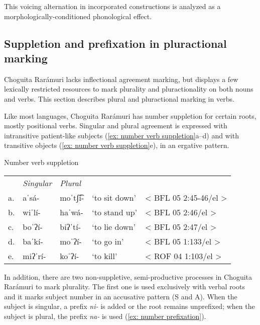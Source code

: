 This voicing alternation in incorporated constructions is analyzed as a morpho\-log\-i\-cally-conditioned phonological effect.


\subsection{Suppletion and prefixation in pluractional marking}
\label{subsec: number marking: suppletion and plural prefixes}

Choguita Rarámuri lacks inflectional agreement marking, but displays a few lexically restricted resources to mark plurality and pluractionality on both nouns and verbs. This section describes plural and pluractional marking in verbs.

Like most  languages, Choguita Rarámuri has number suppletion for certain roots, mostly positional verbs. Singular and plural agreement is expressed with intransitive patient-like subjects (\ref{ex: number verb suppletion}a--d) and with transitive objects (\ref{ex: number verb suppletion}e), in an ergative pattern.

\ea\label{ex: number verb suppletion}
{Number verb suppletion}

\begin{tabular}{lllll}
     & \textit{Singular} & \textit{Plural} & \\
     a. & {aˈsá-}&{moˈtʃ͡í-}&{‘to sit down'}&{< BFL 05 2:45-46/el >}\\
     b. & {wiˈlí-}&{haˈwá-}&{‘to stand up’}&{< BFL 05 2:46/el >}\\
     c. & {boˈʔí-}&{biʔˈtí-}&{‘to lie down’}&{< BFL 05 2:47/el >}\\
     d. & {baˈkí-}&{moˈʔí-}&{‘to go in’}&{< BFL 05 1:133/el >}\\
     e. & {miʔˈrí-}&{koˈʔí-}&{‘to kill’}&{< ROF 04 1:103/el >}\\
\end{tabular}
\z


In addition, there are two non-suppletive, semi-productive processes in Choguita Rarámuri to mark plurality. The first one is used exclusively with verbal roots and it marks subject number in an accusative pattern (S and A). When the subject is singular, a prefix \textit{ni-} is added or the root remains unprefixed; when the subject is plural, the prefix \textit{na-} is used (\ref{ex: number prefixation}).


